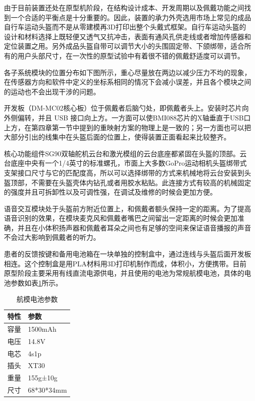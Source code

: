 由于目前装置还处在原型机阶段，在结构设计成本、开发周期以及佩戴功能之间找到一个合适的平衡点是十分重要的。因此，装置的承力外壳选用市场上常见的成品自行车运动头盔而不是从零建模再3D打印出整个头戴式框架。自行车运动头盔的设计和材料选择上既轻便又透气又抗冲击，表面有通风孔供走线或者增加传感器和定位装置之用。另外成品头盔自带可以调节大小的头围固定带、下颌绑带，适合所有的用户头部尺寸，在一次性的原型试验中有着很不错的佩戴舒适度可以调节。

各子系统模块的位置分布如下图所示，重心尽量放在两边以减少压力不均的现象，在传感器方向和软件中定义的坐标系相同的情况下会减小误差，并且各个模块之间的运动也不会出现干涉的问题。

开发板（DM-MC02核心板）位于佩戴者后脑勺处，即佩戴者头上。安装时芯片向外侧偏转，并且 USB 接口向上方。一方面可以使BMI088芯片的X轴垂直于USB口上方，在第四章第一节中提到的重映射方案的物理上是一致的；另一方面也可以把大部分引出的线集中在头盔后面的位置上，使得装置正面看起来比较整齐。

核心功能组件SG90双轴舵机云台和激光模组的云台底座都紧固在头盔的顶部。云台底座中央有一个1/4英寸的标准螺孔，市面上大多数GoPro运动相机头盔绑带式支架接口尺寸与它的匹配度高，所以可以选择绑带的方式来机械地将云台安装到头盔顶部，不需要在头盔壳体内钻孔或者用胶水粘贴。此连接方式有较高的机械固定的强度并且可拆卸性以及可调性强，在调试及维修的时候会更加方便。

语音交互模块处于头盔前方附近位置上，和佩戴者额头保持一定的距离。为了提高语音识别的效果，在模块麦克风和佩戴者嘴巴之间留出一定距离的时候会更加准确，并且在小体积扬声器和佩戴者耳朵之间也有足够的空间来保证语音播报的声音不会过大影响到佩戴者的听力。

患者的反馈按键和备用电池箱在一块单独的控制盒中，通过连线与头盔后面开发板相连。这个控制盒是用PLA材料用3D打印机制作而成，体积小，方便携带。目前原型阶段主要采用有线直流电源供电，并且使用的电池为常规航模电池，具体的电池参数如表\ref{tab:battery_parameters}所示。

\begin{table}[h!]
\centering
\caption{航模电池参数}
\label{tab:battery_parameters}
\begin{tabular}{p{4cm} p{4cm}}
\toprule[1.5pt]
\textbf{特性} & \textbf{参数} \\
\midrule[0.75pt]
容量&1500mAh\\
电压&14.8V\\
电芯&4s1p\\
插头&XT30\\
重量&155g±10g\\
尺寸&68*30*34mm\\
\bottomrule[1.5pt]
\end{tabular}
\end{table}

